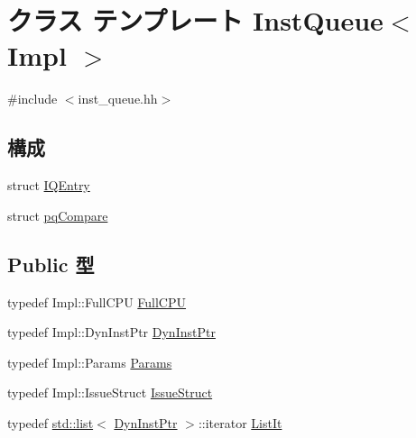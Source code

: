 \hypertarget{classInstQueue}{
\section{クラス テンプレート InstQueue$<$ Impl $>$}
\label{classInstQueue}
}


{\ttfamily \#include $<$inst\_\-queue.hh$>$}\subsection*{構成}
\begin{DoxyCompactItemize}
\item 
struct \hyperlink{structInstQueue_1_1IQEntry}{IQEntry}
\item 
struct \hyperlink{structInstQueue_1_1pqCompare}{pqCompare}
\end{DoxyCompactItemize}
\subsection*{Public 型}
\begin{DoxyCompactItemize}
\item 
typedef Impl::FullCPU \hyperlink{classInstQueue_a90ba84e54618cc07f2e8f05e046cb5ce}{FullCPU}
\item 
typedef Impl::DynInstPtr \hyperlink{classInstQueue_a028ce10889c5f6450239d9e9a7347976}{DynInstPtr}
\item 
typedef Impl::Params \hyperlink{classInstQueue_a818e103eae798a24a06a0a34631849ea}{Params}
\item 
typedef Impl::IssueStruct \hyperlink{classInstQueue_a568c86f6403070f1cb743e994405ba8b}{IssueStruct}
\item 
typedef \hyperlink{classstd_1_1list}{std::list}$<$ \hyperlink{classInstQueue_a028ce10889c5f6450239d9e9a7347976}{DynInstPtr} $>$::iterator \hyperlink{classInstQueue_a184cb829e22cc656acb41864f68f51ea}{ListIt}
\end{DoxyCompactItemize}
